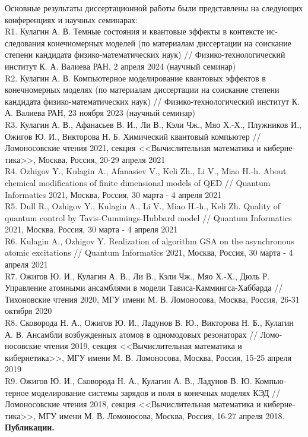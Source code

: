 Основные результаты диссертационной работы были представлены на следующих конференциях и научных семинарах:
\\[12pt]
R1. Кулагин А. В. Темные состояния и квантовые эффекты в контексте ис­следования конечномерных моделей (по материалам диссертации на соискание степени кандидата физико-математических наук) // Физико-технологический институт К. А. Валиева РАН, 2 апреля 2024 (научный семинар)
\\[12pt]
R2. Кулагин А. В. Компьютерное моделирование квантовых эффектов в конечномерных моделях (по материалам диссертации на соискание степени кандидата физико-математических наук) // Физико-технологический институт К. А. Валиева РАН, 23 ноября 2023 (научный семинар)
\\[12pt]
R3. Кулагин А. В., Афанасьев В. И., Ли В., Кэли Чж., Мяо Х.-Х., Плужников И., Ожигов Ю. И., Викторова Н. Б. Химический квантовый компьютер // Ломоносовские чтения 2021, секция <<Вычислительная математика и киберне­тика>>, Москва, Россия, 20-29 апреля 2021
\\[12pt]
R4. Ozhigov Y., Kulagin A., Afanasiev V., Keli Zh., Li V., Miao H.-h. About chemical modifications of finite dimensional models of QED // Quantum Informatics 2021, Москва, Россия, 30 марта - 4 апреля 2021
\\[12pt]
R5. Dull R., Ozhigov Y., Kulagin A., Li V., Miao H.-h., Keli Zh. Quality of quantum control by Tavis-Cummings-Hubbard model // Quantum Informatics 2021, Москва, Россия, 30 марта - 4 апреля 2021
\\[12pt]
R6. Kulagin A., Ozhigov Y. Realization of algorithm GSA on the asynchronous atomic excitations // Quantum Informatics 2021, Москва, Россия, 30 марта - 4 апреля 2021
\\[12pt]
R7. Ожигов Ю. И., Кулагин А. В., Ли В., Кэли Чж., Мяо Х.-Х., Дюль Р. Управление атомными ансамблями в модели Тависа-Каммингса-Хаббарда // Тихоновские чтения 2020, МГУ имени М. В. Ломоносова, Москва, Россия, 26-31 октября 2020
\\[12pt]
R8. Сковорода Н. А., Ожигов Ю. И., Ладунов В. Ю., Викторова Н. Б., Кулагин А. В. Ансамбли возбужденных атомов в одномодовых резонаторах // Ломо­носовские чтения 2019, секция <<Вычислительная математика и кибернетика>>, МГУ имени М. В. Ломоносова, Москва, Россия, 15-25 апреля 2019
\\[12pt]
R9. Ожигов Ю. И., Сковорода Н. А., Кулагин А. В., Ладунов В. Ю. Компью­терное моделирование системы зарядов и поля в конечных моделях КЭД // Ломоносовские чтения 2018, секция <<Вычислительная математика и киберне­тика>>, МГУ имени М. В. Ломоносова, Москва, Россия, 16-27 апреля 2018.
\
\\[18pt]
\indent\textbf{Публикации.}

